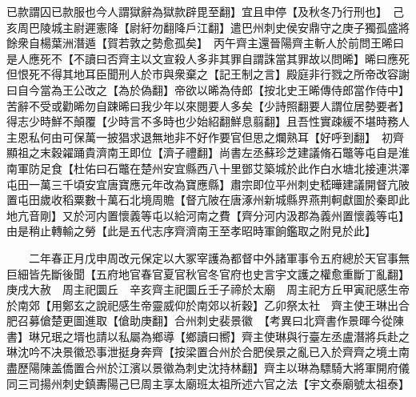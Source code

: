 已款謂囚已款服也今人謂獄辭為獄款辟毘至翻】宜且申停【及秋冬乃行刑也】　己亥周巴陵城主尉遲憲降【尉紆勿翻降戶江翻】遣巴州刺史侯安鼎守之庚子獨孤盛將餘衆自楊葉洲潛遁【賀若敦之勢愈孤矣】　丙午齊主還晉陽齊主斬人於前問王晞曰是人應死不【不讀曰否齊主以文宣殺人多非其罪自謂誅當其罪故以問晞】晞曰應死但恨死不得其地耳臣聞刑人於市與衆棄之【記王制之言】殿庭非行戮之所帝改容謝曰自今當為王公改之【為於偽翻】帝欲以晞為侍郎【按北史王晞傳侍郎當作侍中】苦辭不受或勸晞勿自踈晞曰我少年以來閱要人多矣【少詩照翻要人謂位居勢要者】得志少時鮮不顛覆【少時言不多時也少始紹翻鮮息翦翻】且吾性實疎緩不堪時務人主恩私何由可保萬一披猖求退無地非不好作要官但思之爛熟耳【好呼到翻】　初齊顯祖之末穀糴踊貴濟南王即位【濟子禮翻】尚書左丞蘇珍芝建議脩石鼈等屯自是淮南軍防足食【杜佑曰石鼈在楚州安宜縣西八十里鄧艾築城於此作白水塘北接連洪澤屯田一萬三千頃安宜唐寶應元年改為寶應縣】肅宗即位平州刺史嵇曄建議開督亢陂置屯田歲收稻粟數十萬石北境周贍【督亢陂在唐涿州新城縣界燕荆軻獻圖於秦即此地亢音剛】又於河内置懷義等屯以給河南之費【齊分河内汲郡為義州置懷義等屯】由是稍止轉輸之勞【此是五代志序齊濟南王至孝昭時軍餉鑑取之附見於此】

　　二年春正月戊申周改元保定以大冢宰護為都督中外諸軍事令五府總於天官事無巨細皆先斷後聞【五府地官春官夏官秋官冬官府也史言宇文護之權愈重斷丁亂翻】　庚戌大赦　周主祀圜丘　辛亥齊主祀圜丘壬子禘於太廟　周主祀方丘甲寅祀感生帝於南郊【用鄭玄之說祀感生帝靈威仰於南郊以祈穀】乙卯祭太社　齊主使王琳出合肥召募傖楚更圖進取【傖助庚翻】合州刺史裴景徽　【考異曰北齊書作景暉今從陳書】琳兄珉之壻也請以私屬為鄉導【鄉讀曰嚮】齊主使琳與行臺左丞盧潛將兵赴之琳沈吟不决景徽恐事泄挺身奔齊【按梁置合州於合肥侯景之亂已入於齊齊之境土南盡歷陽陳盖僑置合州於江濱以景徽為刺史沈持林翻】齊主以琳為驃騎大將軍開府儀同三司揚州刺史鎮夀陽己巳周主享太廟班太祖所述六官之法【宇文泰廟號太祖泰】


